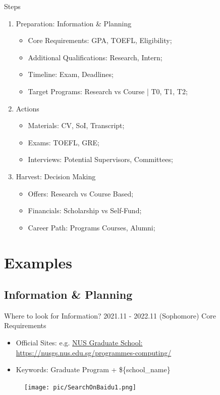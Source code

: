 \documentclass[UTF8]{beamer}
\begin{document}
\begin{frame}{\normalsize{Steps}}
  \begin{enumerate}

    \item Preparation: Information \& Planning

      \begin{itemize}
        \item Core Requirements: \hfill {\tiny GPA, TOEFL, Eligibility;}
        \item Additional Qualifications: \hfill {\tiny Research, Intern;}
        \item Timeline: \hfill {\tiny Exam, Deadlines;}
        \item Target Programs: \hfill {\tiny Research vs Course | T0, T1, T2;}
      \end{itemize}

    \item Actions
      \begin{itemize}
        \item Materials: \hfill {\tiny CV, SoI, Transcript;}
        \item Exams: \hfill {\tiny TOEFL, GRE;}
        \item Interviews: \hfill {\tiny Potential Supervisors, Committees;}
      \end{itemize}

    \item Harvest: Decision Making
      \begin{itemize}
        \item Offers: \hfill {\tiny Research vs Course Based;}
        \item Financials: \hfill {\tiny Scholarship vs Self-Fund;}
        \item Career Path: \hfill {\tiny Programs Courses, Alumni;}
      \end{itemize}
  \end{enumerate}
\end{frame}

\section{Examples}

\subsection{Information  \& Planning}
\begin{frame}{Where to look for Information? \hfill 2021.11 - 2022.11 \tiny{(Sophomore)}}
    {\Large Core Requirements} 
  \begin{itemize}
    \item Official Sites: e.g. \href{https://nusgs.nus.edu.sg/programmes-computing/}{\tiny{NUS Graduate School:} {\tiny https://nusgs.nus.edu.sg/programmes-computing/}}
    \item Keywords: Graduate Program + \$\{school\_name\}
  \end{itemize}
  \begin{figure}[h]
    \centering
    \texttt{[image: pic/SearchOnBaidu1.png]}
  \end{figure}
\end{frame}
\end{document}
